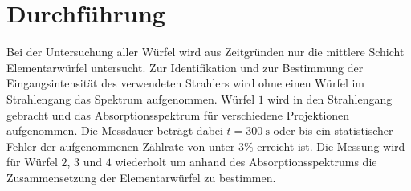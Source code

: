 \section{Durchführung}
\label{sec:Durchführung}

Bei der Untersuchung aller Würfel wird aus Zeitgründen nur die mittlere Schicht Elementarwürfel untersucht.
Zur Identifikation und zur Bestimmung der Eingangsintensität des verwendeten Strahlers wird ohne einen Würfel im Strahlengang das Spektrum aufgenommen.
Würfel $1$ wird in den Strahlengang gebracht und das Absorptionsspektrum für verschiedene Projektionen aufgenommen. Die Messdauer beträgt dabei $t=\SI{300}{\second}$ oder bis ein statistischer Fehler der aufgenommenen Zählrate von unter $3\%$ erreicht ist.
Die Messung wird für Würfel $2$, $3$ und $4$ wiederholt um anhand des Absorptionsspektrums die Zusammensetzung der Elementarwürfel zu bestimmen.